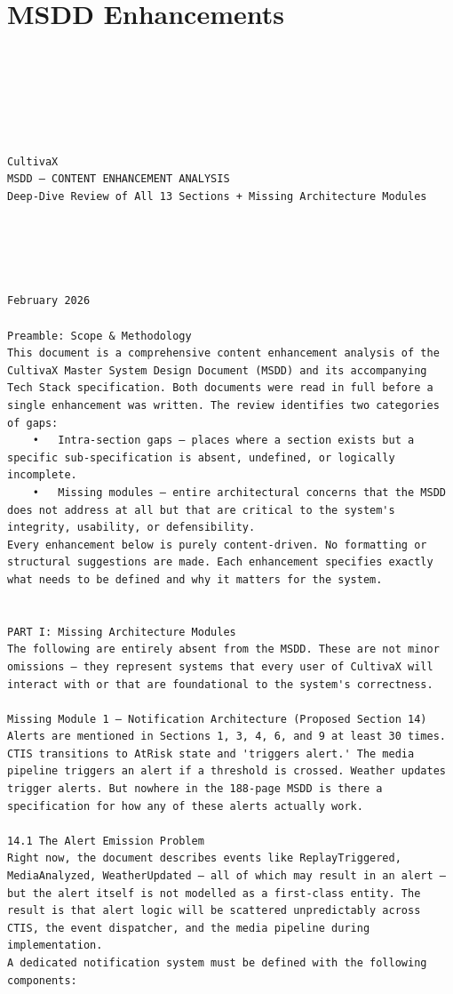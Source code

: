 \documentclass{article}
\begin{document}
\section{MSDD Enhancements}
\begin{verbatim}






CultivaX
MSDD — CONTENT ENHANCEMENT ANALYSIS
Deep-Dive Review of All 13 Sections + Missing Architecture Modules





February 2026

Preamble: Scope & Methodology
This document is a comprehensive content enhancement analysis of the CultivaX Master System Design Document (MSDD) and its accompanying Tech Stack specification. Both documents were read in full before a single enhancement was written. The review identifies two categories of gaps:
	•	Intra-section gaps — places where a section exists but a specific sub-specification is absent, undefined, or logically incomplete.
	•	Missing modules — entire architectural concerns that the MSDD does not address at all but that are critical to the system's integrity, usability, or defensibility.
Every enhancement below is purely content-driven. No formatting or structural suggestions are made. Each enhancement specifies exactly what needs to be defined and why it matters for the system.


PART I: Missing Architecture Modules
The following are entirely absent from the MSDD. These are not minor omissions — they represent systems that every user of CultivaX will interact with or that are foundational to the system's correctness.

Missing Module 1 — Notification Architecture (Proposed Section 14)
Alerts are mentioned in Sections 1, 3, 4, 6, and 9 at least 30 times. CTIS transitions to AtRisk state and 'triggers alert.' The media pipeline triggers an alert if a threshold is crossed. Weather updates trigger alerts. But nowhere in the 188-page MSDD is there a specification for how any of these alerts actually work.

14.1 The Alert Emission Problem
Right now, the document describes events like ReplayTriggered, MediaAnalyzed, WeatherUpdated — all of which may result in an alert — but the alert itself is not modelled as a first-class entity. The result is that alert logic will be scattered unpredictably across CTIS, the event dispatcher, and the media pipeline during implementation.
A dedicated notification system must be defined with the following components:


\end{verbatim}
\end{document}
